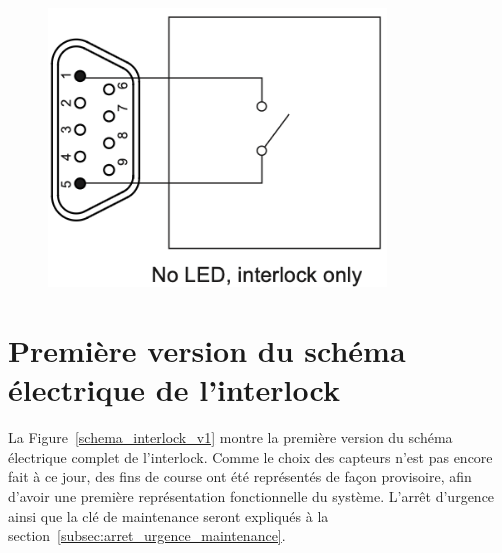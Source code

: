 \begin{minipage}[c]{0.35\textwidth}
    \begin{figure}[H]
        \begin{center}
            \includegraphics[width=0.8\textwidth]{assets/figures/Protections_laser/Securite_electrique/interlock_only.png}
        \end{center}
        \label{Interlock_only}
    \end{figure}
\end{minipage}

\newpage
\section{Première version du schéma électrique de l'interlock}
La Figure~\ref{schema_interlock_v1} montre la première version du schéma électrique complet de l'interlock. Comme le choix des capteurs n'est pas encore fait à ce jour, des fins de course ont été représentés de façon provisoire, afin d'avoir une première représentation fonctionnelle du système. L'arrêt d'urgence ainsi que la clé de maintenance seront expliqués à la section~\ref{subsec:arret_urgence_maintenance}.

